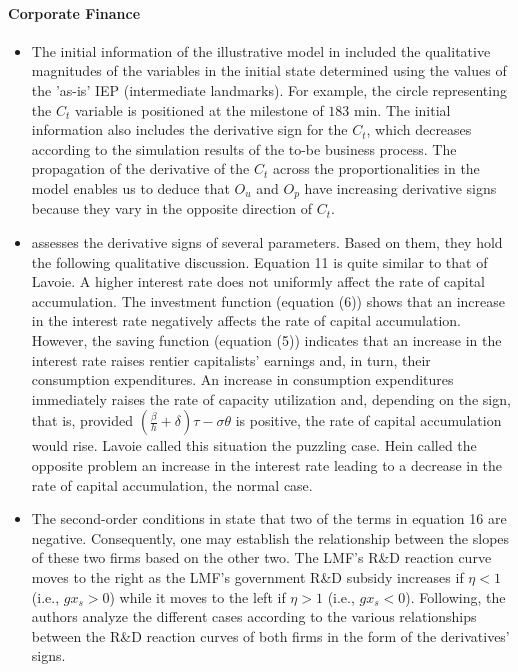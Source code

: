 \documentclass[11pt]{book}
\begin{document}
\paragraph{Corporate Finance}
\begin{itemize}
\item The initial information of the illustrative model in \cite{camara2014methodology}
included the qualitative magnitudes of the variables in the initial
state determined using the values of the 'as-is' IEP (intermediate
landmarks). For example, the circle representing the $C_{t}$ variable
is positioned at the milestone of $183$ min. The initial information
also includes the derivative sign for the $C_{t}$, which decreases
according to the simulation results of the to-be business process.
The propagation of the derivative of the $C_{t}$ across the proportionalities
in the model enables us to deduce that $O_{u}$ and $O_{p}$ have
increasing derivative signs because they vary in the opposite direction
of $C_{t}$.
\item \cite{ko2015corporate}
assesses the derivative signs of several parameters. Based on them,
they hold the following qualitative discussion. Equation 11 is quite
similar to that of Lavoie. A higher interest rate does not uniformly
affect the rate of capital accumulation. The investment function (equation
(6)) shows that an increase in the interest rate negatively affects
the rate of capital accumulation. However, the saving function (equation
(5)) indicates that an increase in the interest rate raises rentier
capitalists' earnings and, in turn, their consumption expenditures.
An increase in consumption expenditures immediately raises the rate
of capacity utilization and, depending on the sign, that is, provided
$\left(\frac{\beta}{h}+\delta\right)\tau-\sigma\theta$ is positive,
the rate of capital accumulation would rise. Lavoie called this situation
the \textquotedbl puzzling case.\textquotedbl{} Hein called the opposite
problem an increase in the interest rate leading to a decrease in
the rate of capital accumulation, the \textquotedbl normal case.\textquotedbl{}
\item The second-order conditions in \cite{ho2021government}
state that two of the terms in equation 16 are negative. Consequently,
one may establish the relationship between the slopes of these two
firms based on the other two. The LMF's R\&D reaction curve moves
to the right as the LMF's government R\&D subsidy increases if $\eta<1$
(i.e., $gx_{s}>0$) while it moves to the left if $\eta>1$ (i.e.,
$gx_{s}<0$). Following, the authors analyze the different cases according
to the various relationships between the R\&D reaction curves of both
firms in the form of the derivatives' signs.
\end{itemize}
\end{document}
